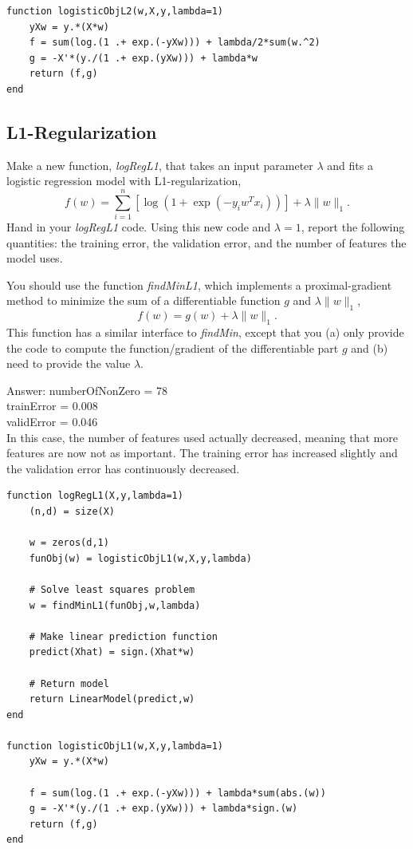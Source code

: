 \documentclass{article}
\def\ans#1{\par\gre{Answer: #1}}
\def\blu#1{{\color{blu}#1}}
\def\gre#1{{\color{gre}#1}}
\def\norm#1{\|#1\|}
\begin{document}
\begin{lstlisting}
function logisticObjL2(w,X,y,lambda=1)
	yXw = y.*(X*w)
	f = sum(log.(1 .+ exp.(-yXw))) + lambda/2*sum(w.^2)
	g = -X'*(y./(1 .+ exp.(yXw))) + lambda*w
	return (f,g)
end
\end{lstlisting}




\pagebreak

\subsection{L1-Regularization}

Make a new function, \emph{logRegL1}, that takes an input parameter $\lambda$ and fits a logistic regression model with L1-regularization,
\[
f(w) = \sum_{i=1}^n \left[\log(1+\exp(-y_iw^Tx_i))\right] + \lambda\norm{w}_1.
\]
\blu{Hand in your \emph{logRegL1} code. Using this new code and $\lambda=1$, report the following quantities: the training error, the validation error, and the number of features the model uses.}


You should use the function \emph{findMinL1}, which implements a proximal-gradient method to minimize the sum of a differentiable function $g$ and $\lambda\norm{w}_1$,
\[
f(w) = g(w) + \lambda \norm{w}_1.
\]
 This function has a similar interface to \emph{findMin}, except that you (a) only provide the code to compute the function/gradient of the differentiable part $g$ and (b) need to provide the value $\lambda$.

\ans{numberOfNonZero = 78\\
trainError = 0.008\\
validError = 0.046\\
In this case, the number of features used actually decreased, meaning that more features are now not as important. The training error has increased slightly and the validation error has continuously decreased.
}

\begin{lstlisting}
function logRegL1(X,y,lambda=1)
	(n,d) = size(X)
	
	w = zeros(d,1)
	funObj(w) = logisticObjL1(w,X,y,lambda)

	# Solve least squares problem
	w = findMinL1(funObj,w,lambda)

	# Make linear prediction function
	predict(Xhat) = sign.(Xhat*w)

	# Return model
	return LinearModel(predict,w)
end

function logisticObjL1(w,X,y,lambda=1)
	yXw = y.*(X*w)

	f = sum(log.(1 .+ exp.(-yXw))) + lambda*sum(abs.(w))
	g = -X'*(y./(1 .+ exp.(yXw))) + lambda*sign.(w)
	return (f,g)
end
\end{lstlisting}
\end{document}
